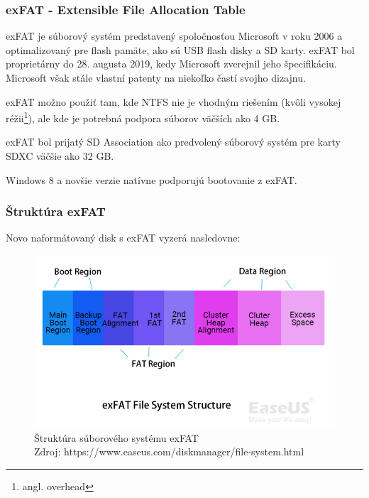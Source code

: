 \documentclass[12pt,oneside,slovak,a4paper]{article}
\begin{document}
\subsubsection{exFAT - Extensible File Allocation Table}
exFAT je súborový systém predstavený spoločnosťou Microsoft v roku 2006 a optimalizovaný pre flash pamäte, ako sú USB flash disky a SD karty. exFAT bol proprietárny do 28. augusta 2019, kedy Microsoft zverejnil jeho špecifikáciu. Microsoft však stále vlastní patenty na niekoľko častí svojho dizajnu.

exFAT možno použiť tam, kde NTFS nie je vhodným riešením (kvôli vysokej réžii\footnote{angl. overhead}), ale kde je potrebná podpora súborov väčších ako 4 GB.

exFAT bol prijatý SD Association ako predvolený súborový systém pre karty SDXC väčšie ako 32 GB.

Windows 8 a novšie verzie natívne podporujú bootovanie z exFAT.

\subsubsection{Štruktúra exFAT}
Novo naformátovaný disk s exFAT vyzerá nasledovne:

\begin{figure}[H]
	\centering
	\captionsetup{justification=centering,margin=2cm}
	\includegraphics[width=\linewidth]{./images/exfat-file-system-structure.png}
	\centering
	\caption{Štruktúra súborového systému exFAT \\ Zdroj: https://www.easeus.com/diskmanager/file-system.html}
\end{figure}
\end{document}
